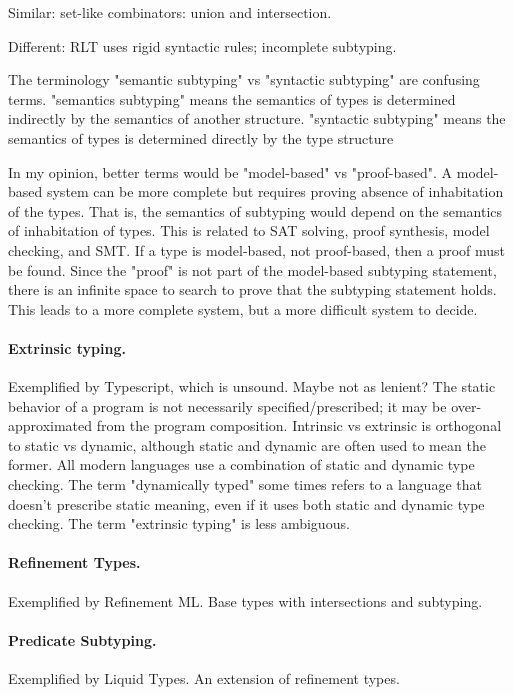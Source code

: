 \documentclass[acmsmall]{acmart}
\begin{document}
Similar: set-like combinators: union and intersection.

Different: RLT uses rigid syntactic rules; incomplete subtyping.

The terminology "semantic subtyping" vs "syntactic subtyping" are confusing terms. 
"semantics subtyping" means the semantics of types is determined indirectly by the semantics of another structure.
"syntactic subtyping" means the semantics of types is determined directly by the type structure

In my opinion, better terms would be "model-based" vs "proof-based".
A model-based system can be more complete but requires proving absence of inhabitation of the types.
That is, the semantics of subtyping would depend on the semantics of inhabitation of types.
This is related to SAT solving, proof synthesis, model checking, and SMT.
If a type is model-based, not proof-based, then a proof must be found.
Since the "proof" is not part of the model-based subtyping statement, 
there is an infinite space to search to prove that the subtyping statement holds.
This leads to a more complete system, but a more difficult system to decide.

\paragraph{Extrinsic typing.}
Exemplified by Typescript, which is unsound. Maybe not as lenient?  
The static behavior of a program is not necessarily specified/prescribed; 
it may be over-approximated from the program composition. 
Intrinsic vs extrinsic is orthogonal to static vs dynamic, although static and dynamic are often used to mean the former.
All modern languages use a combination of static and dynamic type checking.
The term "dynamically typed" some times refers to a language that doesn't prescribe static meaning,
even if it uses both static and dynamic type checking. The term "extrinsic typing" is less ambiguous.

\paragraph{Refinement Types.}
Exemplified by Refinement ML. Base types with intersections and subtyping.

\paragraph{Predicate Subtyping.}
Exemplified by Liquid Types. An extension of refinement types.
\end{document}
